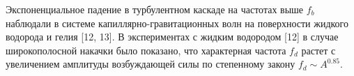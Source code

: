 %




Экспоненциальное падение в турбулентном каскаде на частотах выше $f_b$ наблюдали в системе капиллярно-гравитационных волн на поверхности жидкого водорода и гелия [12, 13]. В экспериментах с жидким водородом [12] в случае широкополосной накачки было показано, что характерная частота $f_d$ растет с увеличением амплитуды возбуждающей силы по степенному закону $f_d \sim A^{0.85}$.

